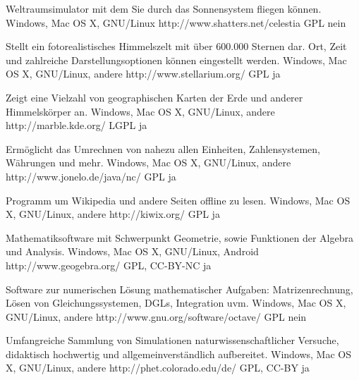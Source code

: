 




{Weltraumsimulator mit dem Sie durch das Sonnensystem fliegen können.}
{Windows, Mac OS X, GNU/Linux}
{http://www.shatters.net/celestia}
{GPL}
{nein}

{Stellt ein fotorealistisches Himmelszelt mit über 600.000 Sternen dar. Ort, Zeit und zahlreiche Darstellungsoptionen können eingestellt werden.}
{Windows, Mac OS X, GNU/Linux, andere}
{http://www.stellarium.org/}
{GPL}
{ja}

{Zeigt eine Vielzahl von geographischen Karten der Erde und anderer Himmelskörper an.}
{Windows, Mac OS X, GNU/Linux, andere}
{http://marble.kde.org/}
{LGPL}
{ja}

{Ermöglicht das Umrechnen von nahezu allen Einheiten, Zahlensystemen, Währungen und mehr.}
{Windows, Mac OS X, GNU/Linux, andere}
{http://www.jonelo.de/java/nc/}
{GPL}
{ja}

{Programm um Wikipedia und andere Seiten offline zu lesen.}
{Windows, Mac OS X, GNU/Linux, andere}
{http://kiwix.org/}
{GPL}
{ja}

{Mathematiksoftware mit Schwerpunkt Geometrie, sowie Funktionen der Algebra und Analysis.}
{Windows, Mac OS X, GNU/Linux, Android}
{http://www.geogebra.org/}
{GPL, CC-BY-NC}
{ja}

{Software zur numerischen Lösung mathematischer Aufgaben: Matrizenrechnung, Lösen von Gleichungssystemen, DGLs, Integration uvm.}
{Windows, Mac OS X, GNU/Linux, andere}
{http://www.gnu.org/software/octave/}
{GPL}
{nein}

{Umfangreiche Sammlung von Simulationen naturwissenschaftlicher Versuche, didaktisch hochwertig und allgemeinverständlich aufbereitet.}
{Windows, Mac OS X, GNU/Linux, andere}
{http://phet.colorado.edu/de/}
{GPL, CC-BY}
{ja}

\backpage


